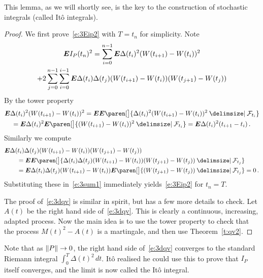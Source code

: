 This lemma, as we will shortly see, is the key to the construction of stochastic integrals (called It\^o integrals).
\begin{proof}%
  We first prove~\eqref{e:3Eip2} with $T = t_n$ for simplicity.
  Note
  \begin{multline}\label{e:3sum1}
    \bm{E} I_P(t_n)^2 
      = \sum_{i=0}^{n-1}
	  \bm{E} \Delta(t_i)^2 (W(t_{i+1}) - W(t_i))^2
    \\
	+ 2 \sum_{j=0}^{n-1}
	  \sum_{i=0}^{i-1}
	  \bm{E} \Delta(t_i) \Delta(t_j)
	    (W(t_{i+1}) - W(t_i))
	    (W(t_{j+1}) - W(t_j))
  \end{multline}
  By the tower property
  \begin{multline*}
    \E \Delta(t_i)^2 (W(t_{i+1}) - W(t_i))^2
      = \E \E \paren[\big]{ \Delta(t_i)^2 (W(t_{i+1}) - W(t_i))^2 \given \mathcal F_{t_i} }
    \\
      = \E \Delta(t_i)^2 \E \paren[\big]{ (W(t_{i+1}) - W(t_i))^2 \given \mathcal F_{t_i} }
      = \E \Delta(t_i)^2 (t_{i+1} - t_i)\,.
  \end{multline*}
  Similarly we compute
  \begin{align*}
    \MoveEqLeft
    \E \Delta(t_i) \Delta(t_j)
      (W(t_{i+1}) - W(t_i))
      (W(t_{j+1}) - W(t_j))
    \\
    &= \E \E \paren[\big]{ \Delta(t_i) \Delta(t_j)
      (W(t_{i+1}) - W(t_i))
      (W(t_{j+1}) - W(t_j)) \given \mathcal F_{t_j} }
    \\
    &= \E \Delta(t_i) \Delta(t_j)
	  (W(t_{i+1}) - W(t_i))
	  \E \paren[\big]{ (W(t_{j+1}) - W(t_j)) \given \mathcal F_{t_j} }
    = 0\,.
  \end{align*}
  Substituting these in~\eqref{e:3sum1} immediately yields~\eqref{e:3Eip2} for $t_n = T$.

  The proof of~\eqref{e:3dqv} is similar in spirit, but has a few more details to check.
  Let $A(t)$ be the right hand side of~\eqref{e:3dqv}.
  This is clearly a continuous, increasing, adapted process.
  Now the main idea is to use the tower property to check that the process $M(t)^2 - A(t)$ is a martingale, and then use Theorem~\ref{t:qv2}.
\end{proof}

Note that as $\lVert P\rVert \to 0$, the right hand side of~\eqref{e:3dqv} converges to the standard Riemann integral $\int_0^T \Delta(t)^2 \, dt$.
It\^o realised he could use this to prove that $I_P$ itself converges, and the limit is now called the It\^o integral.

